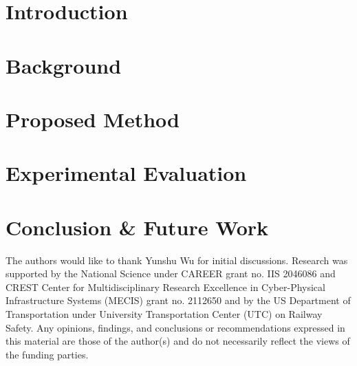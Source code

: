 \documentclass[sigconf]{acmart}
\begin{document}

\maketitle

\section{Introduction}
\label{sec-intro}


\section{Background}
\label{sec-backgound}


%


\section{Proposed Method}
\label{sec-methods}


\section{Experimental Evaluation}
\label{sec-Experimentalevaluations}





\section{Conclusion \& Future Work}
\label{sec-Conclusion}


\begin{acks}
The authors would like to thank Yunshu Wu for initial discussions.
Research was supported by the National Science under CAREER grant no. IIS 2046086 and CREST Center for Multidisciplinary Research Excellence in Cyber-Physical Infrastructure Systems (MECIS) grant no. 2112650 and by the US Department of Transportation under University Transportation Center (UTC) on Railway Safety. Any opinions, findings, and conclusions or recommendations expressed in this material are those of the author(s) and do not necessarily reflect the views of the funding parties.

\end{acks}




\end{document}
